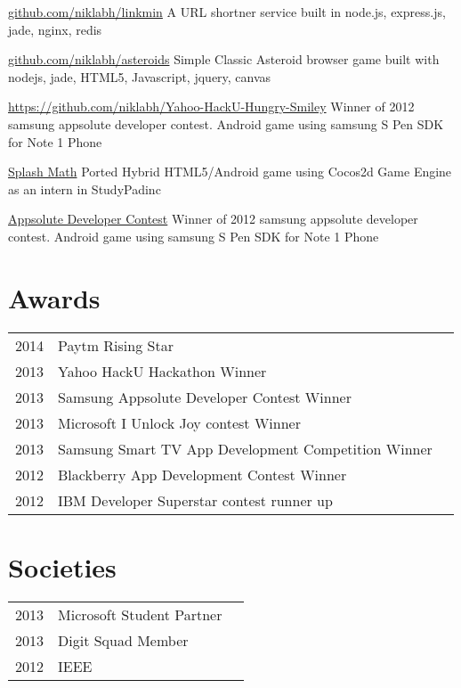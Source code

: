 \documentclass[]{deedy-resume-openfont}
\begin{document}
\begin{minipage}[t]{0.66\textwidth}
\href{https://github.com/niklabh/linkmin}{github.com/niklabh/linkmin}
A URL shortner service built in node.js, express.js, jade, nginx, redis
\sectionsep

\href{https://github.com/niklabh/asteroids}{github.com/niklabh/asteroids}
Simple Classic Asteroid browser game built with nodejs, jade, HTML5, Javascript, jquery, canvas
\sectionsep

\href{https://github.com/niklabh/Yahoo-HackU-Hungry-Smiley}{https://github.com/niklabh/Yahoo-HackU-Hungry-Smiley}
Winner of 2012 samsung appsolute developer contest. Android game using samsung S Pen SDK for Note 1 Phone
\sectionsep

\href{https://play.google.com/store/apps/details?id=com.studypadinc.splashmath.android.grade1.paid}{Splash Math}
Ported Hybrid HTML5/Android game using Cocos2d Game Engine as an intern in StudyPadinc
\sectionsep

\href{https://www.smartappchallenge.com}{Appsolute Developer Contest}
Winner of 2012 samsung appsolute developer contest. Android game using samsung S Pen SDK for Note 1 Phone
\sectionsep



\section{Awards} 
\begin{tabular}{rll}
2014	     & Paytm Rising Star\\
2013	     & Yahoo HackU Hackathon Winner\\
2013	     & Samsung Appsolute Developer Contest Winner\\
2013	     & Microsoft I Unlock Joy contest Winner\\
2013         & Samsung Smart TV App Development Competition Winner\\
2012		 & Blackberry App Development Contest Winner\\
2012		 & IBM Developer Superstar contest runner up\\
\end{tabular}
\sectionsep


\section{Societies} 

\begin{tabular}{rll}
2013 	& Microsoft Student Partner\\
2013    & Digit Squad Member \\
2012    & IEEE\\
\end{tabular}
\sectionsep

\end{minipage} 
\end{document}
